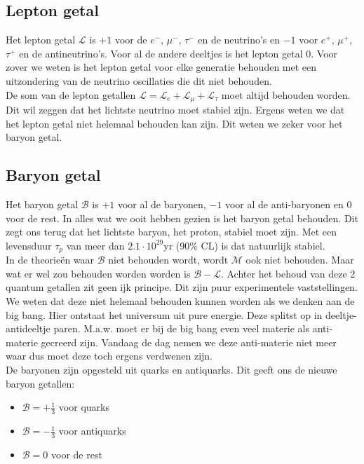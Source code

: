 \documentclass[../main.tex]{subfiles}
\begin{document}
\subsection{Lepton getal}%
\label{sub:lepton_getal}

Het lepton getal $\mathcal{L}$ is $+1$ voor de $e^-$, $\mu^-$, $\tau^-$ en de neutrino's en $-1$ voor $e^+$, $\mu^+$, $\tau^+$ en de antineutrino's. Voor al de andere deeltjes is het lepton getal $0$. Voor zover we weten is het lepton getal voor elke generatie behouden met een uitzondering van de neutrino oscillaties die dit niet behouden.\\
De som van de lepton getallen $\mathcal{L} = \mathcal{L}_e + \mathcal{L}_\mu + \mathcal{L}_\tau$ moet altijd behouden worden. Dit wil zeggen dat het lichtste neutrino moet stabiel zijn. Ergens weten we dat het lepton getal niet helemaal behouden kan zijn. Dit weten we zeker voor het baryon getal.

\subsection{Baryon getal}%
\label{sub:baryon_getal}

Het baryon getal $\mathcal{B}$ is $+1$ voor al de baryonen, $-1$ voor al de anti-baryonen en $0$ voor de rest. In alles wat we ooit hebben gezien is het baryon getal behouden. Dit zegt ons terug dat het lichtste baryon, het proton, stabiel moet zijn. Met een levensduur  $\tau_p$ van meer dan $2.1\cdot 10^{29}$yr (90\% CL) is dat natuurlijk stabiel.\\
In de theorieën waar $\mathcal{B}$ niet behouden wordt, wordt $\mathcal{M}$ ook niet behouden. Maar wat er wel zou behouden worden worden is $\mathcal{B-L}$. Achter het behoud van deze 2 quantum getallen zit geen ijk principe. Dit zijn puur experimentele vaststellingen.  We weten dat deze niet helemaal behouden kunnen worden als we denken aan de big bang. Hier ontstaat het universum uit pure energie. Deze splitst op in deeltje-antideeltje paren. M.a.w. moet er bij de big bang even veel materie als anti-materie gecreerd zijn. Vandaag de dag nemen we deze anti-materie niet meer waar dus moet deze toch ergens verdwenen zijn.\\
De baryonen zijn opgesteld uit quarks en antiquarks. Dit geeft ons de nieuwe baryon getallen:
\begin{itemize}
    \item $\mathcal{B} = +\frac{1}{3}$ voor quarks
    \item $\mathcal{B} = -\frac{1}{3}$ voor antiquarks
    \item $\mathcal{B} = 0$ voor de rest
\end{itemize}
\end{document}
